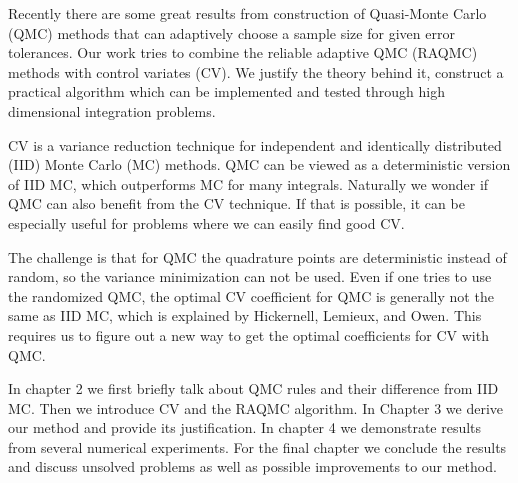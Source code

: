 

Recently there are some great results from construction of Quasi-Monte Carlo (QMC) methods that can adaptively choose a sample size for given error tolerances\cite{hickernell2014reliable}.   
Our work tries to combine the reliable adaptive QMC (RAQMC) methods with control variates (CV). 
We justify the theory behind it, construct a practical algorithm which can be implemented and tested through high dimensional integration problems.

CV is a variance reduction technique for independent and identically distributed (IID) Monte Carlo (MC) methods.
QMC can be viewed as a deterministic version of IID MC, which outperforms MC for many integrals\cite{avramidis1996integrated}. 
Naturally we wonder if QMC can also benefit from the CV technique. If that is possible, it can be especially useful for problems where we can easily find good CV.


The challenge is that for QMC the quadrature points are deterministic instead of random, so the variance minimization can not be used. 
Even if one tries to use the randomized QMC, the optimal CV coefficient for QMC is generally not the same as IID MC, which is explained by Hickernell, Lemieux, and Owen\cite{hickernell2005control}. 
This requires us to figure out a new way to get the optimal coefficients for CV with QMC.


In chapter 2 we first briefly talk about QMC rules and their difference from IID MC. 
Then we introduce CV and the RAQMC algorithm. 
In Chapter 3 we derive our method and provide its justification.
In chapter 4 we demonstrate results from several numerical experiments. For the final chapter we conclude the results and discuss unsolved problems as well as possible improvements to our method.
